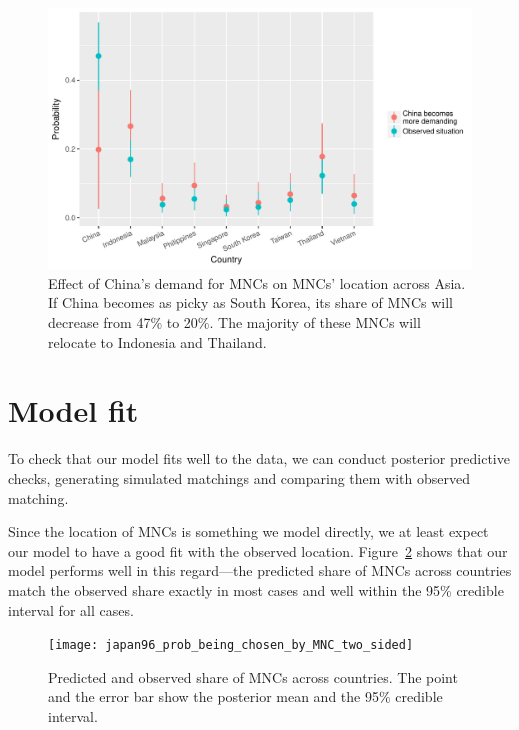 \begin{figure}[!ht]
  \centering
  \includegraphics[width=\textwidth,keepaspectratio]{../figure/japan96_sim_china_more_demanding}
  \caption[Effect of China's demand for MNCs on MNCs' location across
  Asia.]{Effect of China's demand for MNCs on MNCs' location across Asia. If
    China becomes as picky as South Korea, its share of MNCs will decrease from
    47\% to 20\%. The majority of these MNCs will relocate to Indonesia and
    Thailand.}
  \label{fig:japan96_sim_china_more_demanding}
\end{figure}

\section{Model fit}
\label{sec:model_fit}

To check that our model fits well to the data, we can conduct posterior
predictive checks, generating simulated matchings and comparing them with observed
matching.

Since the location of MNCs is something we model directly, we at least
expect our model to have a good fit with the observed location.
Figure~\ref{fig:japan96_prob_being_chosen_by_MNC_two_sided} shows that our model
performs well in this regard---the predicted share of MNCs across countries
match the observed share exactly in most cases and well within the 95\% credible
interval for all cases. 

\begin{figure}[!ht] \centering
\texttt{[image: japan96\_prob\_being\_chosen\_by\_MNC\_two\_sided]}
  \caption[Predicted and observed MNCs' distribution across Asia.]{Predicted and
    observed share of MNCs across countries. The point and the error
bar show the posterior mean and the 95\% credible interval.}
  \label{fig:japan96_prob_being_chosen_by_MNC_two_sided}
\end{figure}

